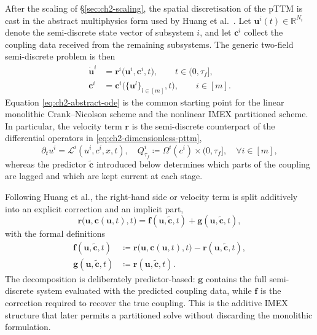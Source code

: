 After the scaling of \S\ref{sec:ch2-scaling}, the spatial discretisation of the pTTM is cast in the abstract multiphysics form used by Huang et al.\ \cite{Huang_2019}. Let $\mathbf{u}^i(t) \in \mathbb{R}^{N_i}$ denote the semi-discrete state vector of subsystem $i$, and let $\mathbf{c}^i$ collect the coupling data received from the remaining subsystems. The generic two-field semi-discrete problem is then
\begin{subequations}\label{eq:ch2-abstract-ode}
    \begin{align}
        \dot{\mathbf{u}}^i & = \mathbf{r}^i\bigl(\mathbf{u}^i, \mathbf{c}^i, t\bigr), \qquad t \in (0, \tau_f], \label{eq:ch2-abstract-ode-a} \\
        \mathbf{c}^i       & = \mathbf{c}^i\bigl(\{\mathbf{u}^l\}_{l \in [m]}, t\bigr), \qquad i \in [m]. \label{eq:ch2-abstract-ode-b}
    \end{align}
\end{subequations}
Equation \eqref{eq:ch2-abstract-ode} is the common starting point for the linear monolithic Crank--Nicolson scheme and the nonlinear IMEX partitioned scheme. In particular, the velocity term $\mathbf{r}$ is the semi-discrete counterpart of the differential operators in \eqref{eq:ch2-dimensionless-pttm},
\begin{equation*}
    \partial_t u^i = \mathcal{L}^i(u^i, c^i, x, t), \quad Q_{\tau_f}^i \coloneqq \Omega^i(c^i) \times (0,\tau_f], \quad \forall i \in [m],
\end{equation*}
whereas the predictor $\tilde{\mathbf{c}}$ introduced below determines which parts of the coupling are lagged and which are kept current at each stage.

Following Huang et al., the right-hand side or velocity term is split additively into an explicit correction and an implicit part,
\begin{equation}
    \mathbf{r}\bigl(\mathbf{u}, \mathbf{c}(\mathbf{u},t), t\bigr)
    = \mathbf{f}(\mathbf{u}, \tilde{\mathbf{c}}, t) + \mathbf{g}(\mathbf{u}, \tilde{\mathbf{c}}, t),
\end{equation}
with the formal definitions
\begin{subequations}\label{eq:ch2-imex-split}
    \begin{align}
        \mathbf{f}(\mathbf{u}, \tilde{\mathbf{c}}, t) & \coloneqq \mathbf{r}\bigl(\mathbf{u}, \mathbf{c}(\mathbf{u},t), t\bigr) - \mathbf{r}(\mathbf{u}, \tilde{\mathbf{c}}, t), \label{eq:ch2-imex-split-f} \\
        \mathbf{g}(\mathbf{u}, \tilde{\mathbf{c}}, t) & \coloneqq \mathbf{r}(\mathbf{u}, \tilde{\mathbf{c}}, t). \label{eq:ch2-imex-split-g}
    \end{align}
\end{subequations}
The decomposition is deliberately predictor-based: $\mathbf{g}$ contains the full semi-discrete system evaluated with the predicted coupling data, while $\mathbf{f}$ is the correction required to recover the true coupling. This is the additive IMEX structure that later permits a partitioned solve without discarding the monolithic formulation.

